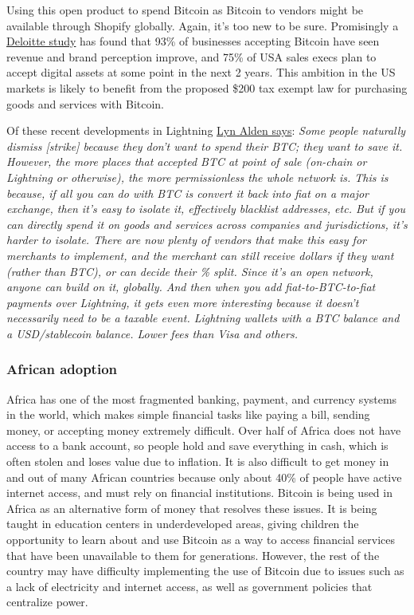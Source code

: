 \begin{itemize}
Using this open product to spend Bitcoin as Bitcoin to vendors might be available through Shopify globally. Again, it's too new to be sure. Promisingly a \href{https://www2.deloitte.com/content/dam/Deloitte/us/Documents/technology/us-cons-merchant-getting-ready-for-crypto.pdf}{Deloitte study} has found that 93\% of businesses accepting Bitcoin have seen revenue and brand perception improve, and 75\% of USA sales execs plan to accept digital assets at some point in the next 2 years. This ambition in the US markets is likely to benefit from the proposed \$200 tax exempt law for purchasing goods and services with Bitcoin.\par
Of these recent developments in Lightning \href{https://twitter.com/LynAldenContact/status/1512188883101966351}{Lyn Alden says}: \textit{Some people naturally dismiss [strike] because they don't want to spend their BTC; they want to save it. However, the more places that accepted BTC at point of sale (on-chain or Lightning or otherwise), the more permissionless the whole network is. This is because, if all you can do with BTC is convert it back into fiat on a major exchange, then it's easy to isolate it, effectively blacklist addresses, etc. But if you can directly spend it on goods and services across companies and jurisdictions, it's harder to isolate. There are now plenty of vendors that make this easy for merchants to implement, and the merchant can still receive dollars if they want (rather than BTC), or can decide their \% split. Since it's an open network, anyone can build on it, globally. And then when you add fiat-to-BTC-to-fiat payments over Lightning, it gets even more interesting because it doesn't necessarily need to be a taxable event. Lightning wallets with a BTC balance and a USD/stablecoin balance. Lower fees than Visa and others.}\par
\subsubsection{African adoption}
Africa has one of the most fragmented banking, payment, and currency systems in the world, which makes simple financial tasks like paying a bill, sending money, or accepting money extremely difficult. Over half of Africa does not have access to a bank account, so people hold and save everything in cash, which is often stolen and loses value due to inflation. It is also difficult to get money in and out of many African countries because only about 40\% of people have active internet access, and must rely on financial institutions. Bitcoin is being used in Africa as an alternative form of money that resolves these issues. It is being taught in education centers in underdeveloped areas, giving children the opportunity to learn about and use Bitcoin as a way to access financial services that have been unavailable to them for generations. However, the rest of the country may have difficulty implementing the use of Bitcoin due to issues such as a lack of electricity and internet access, as well as government policies that centralize power.

\end{itemize}
